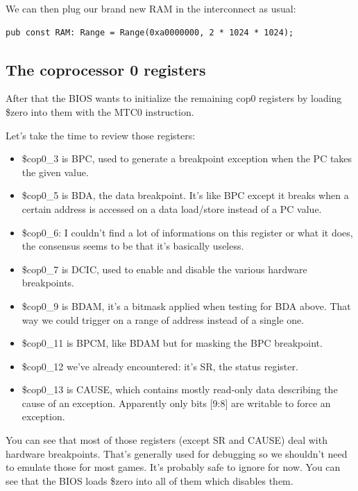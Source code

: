 \documentclass[a4paper]{article}
\begin{document}
We can then plug our brand new RAM in the interconnect as usual:

\begin{lstlisting}
pub const RAM: Range = Range(0xa0000000, 2 * 1024 * 1024);
\end{lstlisting}

\subsection{The coprocessor 0 registers}

After that the BIOS wants to initialize the remaining cop0 registers
by loading \$zero into them with the MTC0 instruction.

Let's take the time to review those registers:

\begin{itemize}
\item \$cop0\_3 is BPC, used to generate a breakpoint exception when the
  PC takes the given value.

\item \$cop0\_5 is BDA, the data breakpoint. It's like BPC except it
  breaks when a certain address is accessed on a data load/store instead
  of a PC value.

\item \$cop0\_6: I couldn't find a lot of informations on this
  register or what it does, the consensus seems to be that it's
  basically useless.

\item \$cop0\_7 is DCIC, used to enable and disable the various
  hardware breakpoints.

\item \$cop0\_9 is BDAM, it's a bitmask applied when testing for BDA
  above. That way we could trigger on a range of address instead of a
  single one.

\item \$cop0\_11 is BPCM, like BDAM but for masking the BPC
  breakpoint.

\item \$cop0\_12 we've already encountered: it's SR, the status register.

\item \$cop0\_13 is CAUSE, which contains mostly read-only data
  describing the cause of an exception. Apparently only bits [9:8] are
  writable to force an exception.
\end{itemize}

You can see that most of those registers (except SR and CAUSE) deal
with hardware breakpoints. That's generally used for debugging so we
shouldn't need to emulate those for most games. It's probably safe to
ignore for now. You can see that the BIOS loads \$zero into all of
them which disables them.
\end{document}
